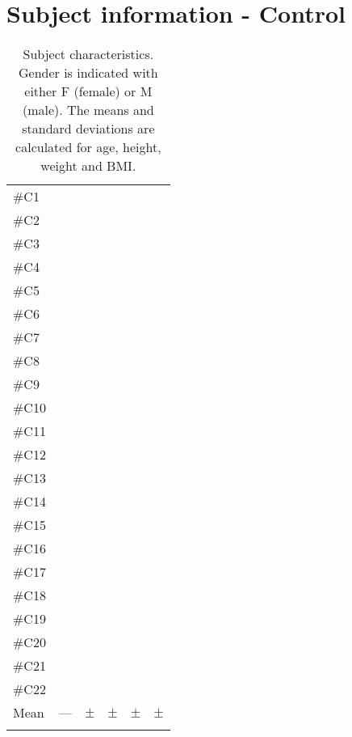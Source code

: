 \section{Subject information - Control}
\begin{longtable}{l|c|c|c|c|c}
	\rowcolor[HTML]{C0C0C0} \rule{0pt}{3ex}  \color[HTML]{000000}{Subject} & \color[HTML]{000000}{Gender} & \color[HTML]{000000}{Age} & \color[HTML]{000000}{Weight} & \color[HTML]{000000}{Height} &  \color[HTML]{000000}{BMI} 
	\\ \hline \rule{0pt}{3ex} 
\#C1 &  &  &  &  & \\ \hline \hline \rule{0pt}{3ex} 
\#C2 &  &  &  &  & \\ \hline \hline \rule{0pt}{3ex} 
\#C3 &  &  &  &  & \\ \hline \hline \rule{0pt}{3ex} 
\#C4 &  &  &  &  & \\ \hline \hline \rule{0pt}{3ex} 
\#C5 &  &  &  &  & \\ \hline \hline \rule{0pt}{3ex} 
\#C6 &  &  &  &  & \\ \hline \hline \rule{0pt}{3ex} 
\#C7 &  &  &  &  & \\ \hline \hline \rule{0pt}{3ex} 
	\#C8 &  &  &  &  & \\ \hline \hline \rule{0pt}{3ex} 
	\#C9 &  &  &  &  & \\ \hline \hline \rule{0pt}{3ex} 
	\#C10 &  &  &  &  & \\ \hline \hline \rule{0pt}{3ex} 
	\#C11 &  &  &  &  & \\ \hline \hline \rule{0pt}{3ex} 
\#C12 &  &  &  &  & \\ \hline \hline \rule{0pt}{3ex} 
\#C13 &  &  &  &  & \\ \hline \hline \rule{0pt}{3ex} 
\#C14 &  &  &  &  & \\ \hline \hline \rule{0pt}{3ex} 
\#C15 &  &  &  &  & \\ \hline \hline \rule{0pt}{3ex} 
\#C16 &  &  &  &  & \\ \hline \hline \rule{0pt}{3ex} 
\#C17 &  &  &  &  & \\ \hline \hline \rule{0pt}{3ex} 
	\#C18 &  &  &  &  & \\ \hline \hline \rule{0pt}{3ex} 
	\#C19 &  &  &  &  & \\ \hline \hline \rule{0pt}{3ex} 
	\#C20 &  &  &  &  & \\ \hline \hline \rule{0pt}{3ex}
		\#C21&  &  &  &  & \\ \hline \hline \rule{0pt}{3ex} 
	\#C22 &  &  &  &  & \\ \hline \hline \rule{0pt}{3ex}  
	Mean & --- & $\pm$  &  $\pm$ &  $\pm$  &  $\pm$
	\\ \hline 
	\caption{Subject characteristics. Gender is indicated with either F (female) or M (male). The means and standard deviations are calculated for age, height, weight and BMI.}
	\label{tab:subjects}
\end{longtable}
\vspace{-.5cm}
